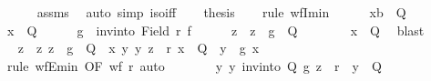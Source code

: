 \begin{isabellebody}
\ \ \ \ \isamarkupfalse%
\ assms\ \isamarkupfalse%
\ {\isacharparenleft}{\kern0pt}auto\ simp{\isacharcolon}{\kern0pt}\ iso{\isacharunderscore}{\kern0pt}iff{}{\isacharparenright}{\kern0pt}\isanewline
\ \ \isamarkupfalse%
\ {\isacharquery}{\kern0pt}thesis\isanewline
\ \ \isamarkupfalse%
\ {\isacharparenleft}{\kern0pt}rule\ wfI{\isacharunderscore}{\kern0pt}min{\isacharparenright}{\kern0pt}\isanewline
\ \ \ \ \isamarkupfalse%
\ x{\isacharcolon}{\kern0pt}{\isacharcolon}{\kern0pt}{\isacharprime}{\kern0pt}b\ \ Q\isanewline
\ \ \ \ \isamarkupfalse%
\ {\isachardoublequoteopen}x\ {\isasymin}\ Q{\isachardoublequoteclose}\isanewline
\ \ \ \ \isamarkupfalse%
\ {\isacharquery}{\kern0pt}g\ {\isacharequal}{\kern0pt}\ {\isachardoublequoteopen}inv{\isacharunderscore}{\kern0pt}into\ {\isacharparenleft}{\kern0pt}Field\ r{\isacharparenright}{\kern0pt}\ f{\isachardoublequoteclose}\isanewline
\ \ \ \ \isamarkupfalse%
\ z{}\ \ {\isachardoublequoteopen}z{}\ {\isasymin}\ {\isacharquery}{\kern0pt}g\ {\isacharbackquote}{\kern0pt}\ Q{\isachardoublequoteclose}\isanewline
\ \ \ \ \ \ \isamarkupfalse%
\ {\isacartoucheopen}x\ {\isasymin}\ Q{\isacartoucheclose}\ \isamarkupfalse%
\ blast\ \isanewline
\ \ \ \ \isamarkupfalse%
\ \isamarkupfalse%
\ z\ \ z{\isacharcolon}{\kern0pt}\ {\isachardoublequoteopen}z\ {\isasymin}\ {\isacharquery}{\kern0pt}g\ {\isacharbackquote}{\kern0pt}\ Q{\isachardoublequoteclose}\ \ {\isachardoublequoteopen}{\isasymAnd}x\ y{\isachardot}{\kern0pt}\ {\isasymlbrakk}{\isacharparenleft}{\kern0pt}y{\isacharcomma}{\kern0pt}\ z{\isacharparenright}{\kern0pt}\ {\isasymin}\ r{\isacharsemicolon}{\kern0pt}\ x\ {\isasymin}\ Q{\isasymrbrakk}\ {\isasymLongrightarrow}\ y\ {\isasymnoteq}\ {\isacharquery}{\kern0pt}g\ x{\isachardoublequoteclose}\isanewline
\ \ \ \ \ \ \isamarkupfalse%
\ {\isacharparenleft}{\kern0pt}rule\ wfE{\isacharunderscore}{\kern0pt}min\ {\isacharbrackleft}{\kern0pt}OF\ {\isacartoucheopen}wf\ r{\isacartoucheclose}{\isacharbrackright}{\kern0pt}{\isacharparenright}{\kern0pt}\ auto\isanewline
\ \ \ \ \isamarkupfalse%
\ \isamarkupfalse%
\ {\isachardoublequoteopen}{\isasymforall}y{\isachardot}{\kern0pt}\ {\isacharparenleft}{\kern0pt}y{\isacharcomma}{\kern0pt}\ inv{\isacharunderscore}{\kern0pt}into\ Q\ {\isacharquery}{\kern0pt}g\ z{\isacharparenright}{\kern0pt}\ {\isasymin}\ r{\isacharprime}{\kern0pt}\ {\isasymlongrightarrow}\ y\ {\isasymnotin}\ Q{\isachardoublequoteclose}\isanewline

\end{isabellebody}
